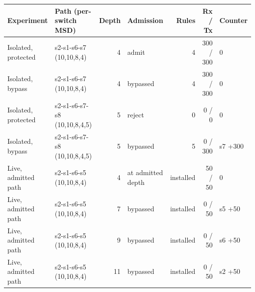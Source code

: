 \begin{tabular}{@{}llrlrrl@{}}
\toprule
Experiment & Path (per-switch MSD) & Depth & Admission & Rules & Rx / Tx & Counter \\
\midrule
Isolated, protected & s2-s1-s6-s7 (10,10,8,4) & 4 & admit & 4 & 300 / 300 & 0 \\
Isolated, bypass & s2-s1-s6-s7 (10,10,8,4) & 4 & bypassed & 4 & 300 / 300 & 0 \\
Isolated, protected & s2-s1-s6-s7-s8 (10,10,8,4,5) & 5 & reject & 0 & 0 / 0 & 0 \\
Isolated, bypass & s2-s1-s6-s7-s8 (10,10,8,4,5) & 5 & bypassed & 5 & 0 / 300 & s7 +300 \\
\midrule
Live, admitted path & s2-s1-s6-s5 (10,10,8,4) & 4 & at admitted depth & installed & 50 / 50 & 0 \\
Live, admitted path & s2-s1-s6-s5 (10,10,8,4) & 7 & bypassed & installed & 0 / 50 & s5 +50 \\
Live, admitted path & s2-s1-s6-s5 (10,10,8,4) & 9 & bypassed & installed & 0 / 50 & s6 +50 \\
Live, admitted path & s2-s1-s6-s5 (10,10,8,4) & 11 & bypassed & installed & 0 / 50 & s2 +50 \\
\bottomrule
\end{tabular}
